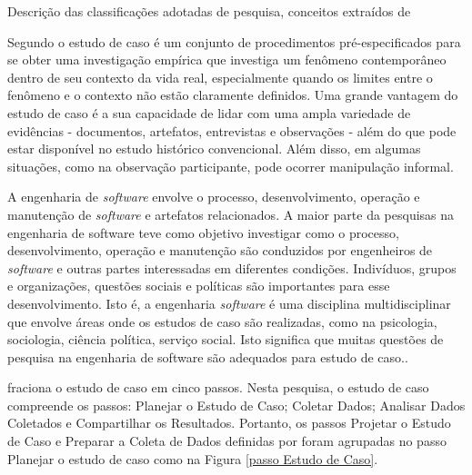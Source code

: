 \begin{table}[!ht]
	\begin{center}
	
	 
	\caption{Descrição das classificações adotadas de pesquisa, conceitos extraídos de  }
	\label{tab:descricaoMetodologia}
	\end{center}
	\end{table}	
	\FloatBarrier

Segundo \cite{yin2001estudo} o estudo de caso é um conjunto de procedimentos pré-especificados para se obter uma investigação empírica que investiga um fenômeno contemporâneo dentro de seu contexto da vida real, especialmente quando os limites entre o fenômeno e o contexto não estão claramente definidos. Uma grande vantagem do estudo de caso é a sua capacidade de lidar com uma ampla variedade de evidências - documentos, artefatos, entrevistas e observações - além do que pode estar disponível no estudo histórico convencional. Além disso, em algumas situações, como na observação participante, pode ocorrer manipulação informal.

A engenharia de \textit{software} envolve o processo, desenvolvimento, operação e manutenção  de \textit{software} e artefatos relacionados. A maior parte da pesquisas na engenharia de software teve como objetivo investigar como o processo, desenvolvimento, operação e manutenção são conduzidos por engenheiros de \textit{software} e outras partes interessadas em diferentes condições. Indivíduos, grupos e organizações, questões sociais e políticas são importantes para esse desenvolvimento. Isto é, a engenharia \textit{software } é uma disciplina multidisciplinar que envolve áreas onde os estudos de caso são realizadas, como na psicologia, sociologia, ciência política, serviço social. Isto significa que muitas questões de pesquisa na engenharia de software são adequados para estudo de caso.\cite{wohlin2012experimentation}.

\cite{wohlin2012experimentation} fraciona o estudo de caso em cinco passos. Nesta pesquisa, o estudo de caso compreende os passos: Planejar o Estudo de Caso; Coletar Dados; Analisar Dados Coletados e Compartilhar os Resultados. Portanto, os passos Projetar o Estudo de Caso e Preparar a Coleta de Dados definidas por  foram agrupadas no passo Planejar o estudo de caso como na Figura \ref{passo Estudo de Caso}.

